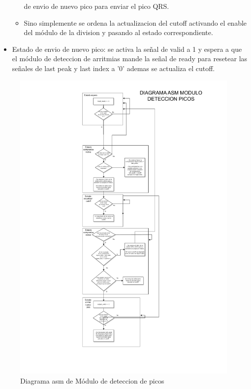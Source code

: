 \begin{itemize}
\begin{itemize}
         de envio de nuevo pico para enviar el pico QRS.
        \item Sino simplemente se ordena la actualizacion del cutoff activando el enable del módulo de la division y pasando al estado correspondiente.
    \end{itemize}
    \item Estado de envio de nuevo pico: se activa la señal de valid a 1 y espera a que el módulo de deteccion de arritmias mande la señal de ready para resetear 
    las señales de last peak y last index a '0' ademas se actualiza el cutoff.
\end{itemize}

\begin{figure}[h!]
    \centering
    \includegraphics[width=0.99\textwidth]{./Images/img_implementacion_hw/Diagramaasmpicos.pdf}
    \caption{Diagrama asm de Módulo de deteccion de picos}
    \label{fig:Diagramaasmpicos}
\end{figure} 

